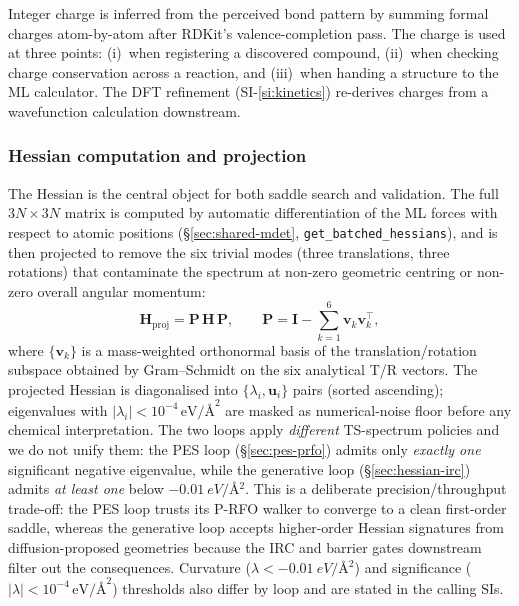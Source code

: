 Integer charge is inferred from the perceived bond pattern by summing formal charges atom-by-atom after RDKit's valence-completion pass. The charge is used at three points: (i)~when registering a discovered compound, (ii)~when checking charge conservation across a reaction, and (iii)~when handing a structure to the ML calculator. The DFT refinement (SI-\ref{si:kinetics}) re-derives charges from a wavefunction calculation downstream.


\subsubsection{Hessian computation and projection}
\label{sec:shared-hessian}

The Hessian is the central object for both saddle search and validation. The full $3N \times 3N$ matrix is computed by automatic differentiation of the ML forces with respect to atomic positions (\S\ref{sec:shared-mdet}, \texttt{get\_batched\_hessians}), and is then projected to remove the six trivial modes (three translations, three rotations) that contaminate the spectrum at non-zero geometric centring or non-zero overall angular momentum:
\begin{equation}
    \mathbf{H}_\text{proj} = \mathbf{P}\,\mathbf{H}\,\mathbf{P}, \qquad \mathbf{P} = \mathbf{I} - \sum_{k=1}^{6} \mathbf{v}_k \mathbf{v}_k^\top,
\end{equation}
where $\{\mathbf{v}_k\}$ is a mass-weighted orthonormal basis of the translation/rotation subspace obtained by Gram--Schmidt on the six analytical T/R vectors. The projected Hessian is diagonalised into $\{\lambda_i, \mathbf{u}_i\}$ pairs (sorted ascending); eigenvalues with $|\lambda_i| < 10^{-4}\,\text{eV/\AA}^2$ are masked as numerical-noise floor before any chemical interpretation. The two loops apply \emph{different} TS-spectrum policies and we do not unify them: the PES loop (\S\ref{sec:pes-prfo}) admits only \emph{exactly one} significant negative eigenvalue, while the generative loop (\S\ref{sec:hessian-irc}) admits \emph{at least one} below $\SI{-0.01}{eV/\angstrom^2}$. This is a deliberate precision/throughput trade-off: the PES loop trusts its P-RFO walker to converge to a clean first-order saddle, whereas the generative loop accepts higher-order Hessian signatures from diffusion-proposed geometries because the IRC and barrier gates downstream filter out the consequences. Curvature ($\lambda < \SI{-0.01}{eV/\angstrom^2}$) and significance ($|\lambda| < 10^{-4}\,\text{eV/\AA}^2$) thresholds also differ by loop and are stated in the calling SIs.



